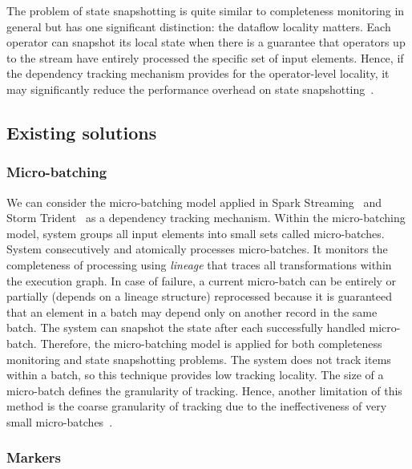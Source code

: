 The problem of state snapshotting is quite similar to completeness monitoring in general but has one significant distinction: the dataflow locality matters. Each operator can snapshot its local state when there is a guarantee that operators up to the stream have entirely processed the specific set of input elements. Hence, if the dependency tracking mechanism provides for the operator-level locality, it may significantly reduce the performance overhead on state snapshotting~\cite{Carbone:2017:SMA:3137765.3137777}.

\subsection{Existing solutions} \label{existing_solutions}

\subsubsection{Micro-batching}

We can consider the micro-batching model applied in Spark Streaming~\cite{Zaharia:2012:DSE:2342763.2342773} and Storm Trident~\cite{apache:storm:trident} as a dependency tracking mechanism. Within the micro-batching model, system groups all input elements into small sets called micro-batches. System consecutively and atomically processes micro-batches. It monitors the completeness of processing using {\em lineage} that traces all transformations within the execution graph. In case of failure, a current micro-batch can be entirely or partially (depends on a lineage structure) reprocessed because it is guaranteed that an element in a batch may depend only on another record in the same batch. The system can snapshot the state after each successfully handled micro-batch. Therefore, the micro-batching model is applied for both completeness monitoring and state snapshotting problems. The system does not track items within a batch, so this technique provides low tracking locality. The size of a micro-batch defines the granularity of tracking. Hence, another limitation of this method is the coarse granularity of tracking due to the ineffectiveness of very small micro-batches~\cite{Zaharia:2012:DSE:2342763.2342773}.

\subsubsection{Markers}


